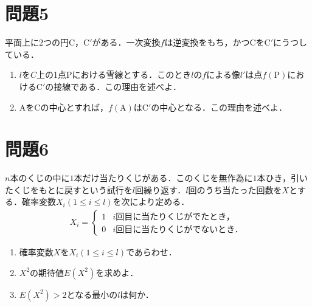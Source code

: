 \documentclass[unicode,12pt, A4j]{ltjsarticle}%
\begin{document}
\section{問題5}
平面上に$2$つの円$\mathrm{C}$，$\mathrm{C'}$がある．一次変換$f$は逆変換をもち，かつ$\mathrm{C}$を$\mathrm{C'}$にうつしている．
\begin{enumerate}
 \item $l$を$C$上の1点$\mathrm{P}$における雪線とする．このとき$l$の$f$による像$l'$は点$f(\mathrm{P})$における$\mathrm{C'}$の接線である．この理由を述べよ．
 \item $\mathrm{A}$を$\mathrm{C}$の中心とすれば，$f(\mathrm{A})$は$\mathrm{C'}$の中心となる．この理由を述べよ．
\end{enumerate}


\section{問題6}
$n$本のくじの中に$1$本だけ当たりくじがある．このくじを無作為に$1$本ひき，引いたくじをもとに戻すという試行を$l$回繰り返す．$l$回のうち当たった回数を$X$とする．確率変数$X_i (1\le i\le l)$を次により定める．
\begin{align*}
 X_i=
 \begin{cases}
  1 & \text{$i$回目に当たりくじがでたとき，}\\
  0 &  \text{$i$回目に当たりくじがでないとき．}
 \end{cases}
\end{align*}
\begin{enumerate}
 \item 確率変数$X$を$X_i (1\le i\le l)$であらわせ．
 \item $X^2$の期待値$E(X^2)$を求めよ．
 \item $E(X^2)>2$となる最小の$l$は何か．
\end{enumerate}
\end{document}
